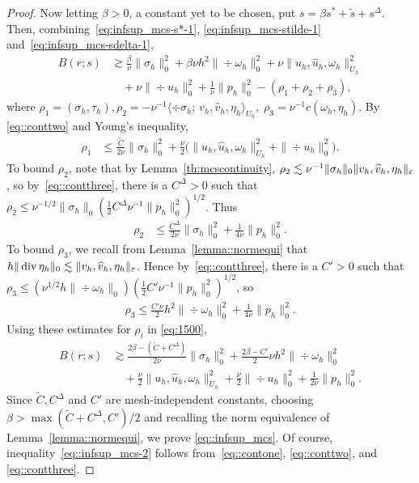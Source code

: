 \begin{proof}
Now letting $\beta > 0$, a constant yet to be
chosen, put $s = \beta s^* + \tilde s + s^\Delta$.
Then, combining~\eqref{eq:infsup_mcs-s*-1},
\eqref{eq:infsup_mcs-stilde-1}
and~\eqref{eq:infsup_mcs-sdelta-1}, 
\begin{equation}
  \label{eq:1500}
  \begin{aligned}
    B(r; s)
    & \gtrsim \frac{\beta}{\nu}\|\sigma_h\|^2_0 + \beta \nu  h^2\|\div \omega_h \|^2_0  + \nu \|u_h, \hat{u}_h, \omega_h\|^2_{U_h}\\
    & \quad  + \nu \| \div u_h \|^2_0  + \frac 1 \nu \| p_h  \|_0^2
    - (\rho_1 + \rho_2 + \rho_3),
  \end{aligned}  
\end{equation}
where
$ \rho_1 = (\sigma_h, \tau_h), \rho_2 = - \nu^{-1}\langle
\div\sigma_h;\, v_h,\hat v_h, \eta_h \rangle_{U_h}, \; \rho_3 =
\nu^{-1} c(\omega_h, \eta_h).$ By \eqref{eq::conttwo} and Young's
inequality,
\begin{align*}
  \rho_1
  & \le \frac{\tilde C}{2 \nu} \|\sigma_h\|_0^2 +
  \frac{\nu}{2}  \Big( \|u_h,
  \hat{u}_h, \omega_h\|^2_{U_h} + \| \div u_h \|^2_0\Big).
\end{align*}
To bound $\rho_2$, note that by Lemma~\ref{th:mcscontinuity},
$\rho_2 \lesssim \nu^{-1} \| \sigma_h \|_0 \| v_h,\widehat v_h,
\eta_h\|_\varepsilon $, so by~\eqref{eq::contthree}, there is a $C^\Delta>0$
such that
$\rho_2 \le \nu^{-1/2} \| \sigma_h \|_0 \left(\frac 1 2 C^\Delta
  \nu^{-1} \| p_h \|_0^2\right)^{1/2}$. Thus
\begin{align*}
  \rho_2
  & 
    \le \frac{C^\Delta}{2 \nu} \| \sigma_h\|_0^2 + \frac{1}{4\nu} \| p_h\|_0^2.
\end{align*}
To bound $\rho_3$, we recall from Lemma~\ref{lemma::normequi} that
$ h\| \operatorname{div} \eta_h \|_0 \lesssim \| v_h,\widehat v_h, \eta_h
\|_{\varepsilon}$. Hence by~\eqref{eq::contthree}, there is a $C'>0$ such
that
$\rho_3 \le (\nu^{1/2}h \| \div \omega_h \|_0) \left( \frac 1 2 C'
  \nu^{-1} \| p_h \|_0^2 \right)^{1/2}$, so
\begin{align*}
  \rho_3 \le \frac{C'\nu}{2} h^2 \| \div \omega_h \|_0^2
  + \frac{1}{4 \nu} \|p_h \|_0^2.
\end{align*}
Using these  estimates for $\rho_i$ in \eqref{eq:1500},
\begin{align*}
    B(r; s)
  &
    \gtrsim \frac{2\beta - (\tilde C + C^\Delta)}{2\nu}
    \|\sigma_h\|^2_0 + \frac{2\beta - C'}{2}\nu  h^2\|\div \omega_h \|^2_0
  \\
  & \quad + 
    \frac{\nu}{2} \|u_h, \hat{u}_h, \omega_h\|^2_{U_h} +
    \frac{\nu}{2} \| \div u_h \|^2_0 + \frac {1}{2\nu} \| p_h  \|_0^2.
\end{align*}
Since $\tilde C, C^\Delta$ and $C'$ are mesh-independent constants,
choosing $\beta > \max(\tilde C + C^\Delta , C')/2$ and recalling the
norm equivalence of Lemma~\ref{lemma::normequi}, we prove
\eqref{eq::infsup_mcs}. Of course, inequality~\eqref{eq::infsup_mcs-2} follows
from~\eqref{eq::contone}, \eqref{eq::conttwo}, and
\eqref{eq::contthree}.
\qqed
\end{proof}




